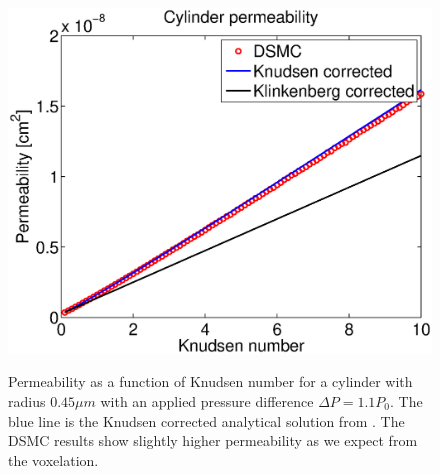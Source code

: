 \begin{figure}[h]
\begin{center}
\includegraphics[width=\textwidth, trim=0cm 0cm 0cm 0cm, clip]{DSMC/figures/cylinder_knudsen_permeability.eps}
\label{fig:one_cylinder_varying_knudsen}
\end{center}
\caption{Permeability as a function of Knudsen number for a cylinder with radius $0.45 \mu m$ with an applied pressure difference $\Delta P = 1.1P_0$. The blue line is the Knudsen corrected analytical solution from \cite{karniadakis2005microflows}. The DSMC results show slightly higher permeability as we expect from the voxelation.}
\end{figure}

